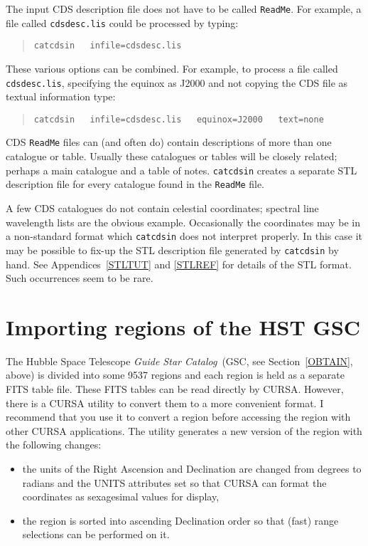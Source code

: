 \documentclass[twoside,11pt]{article}
\newcommand{\xlabel}[1]{}
\renewcommand{\_}{\texttt{\symbol{95}}}
\begin{document}
The input CDS description file does not have to be called {\tt ReadMe}.
For example, a file called {\tt cdsdesc.lis} could be processed by
typing:

\begin{verse}
{\tt catcdsin ~ infile=cdsdesc.lis}
\end{verse}

These various options can be combined.  For example, to process a
file called {\tt cdsdesc.lis}, specifying the equinox as J2000 and
not copying the CDS file as textual information type:

\begin{verse}
{\tt catcdsin ~ infile=cdsdesc.lis ~ equinox=J2000 ~ text=none}
\end{verse}

CDS {\tt ReadMe} files can (and often do) contain descriptions of more
than one catalogue or table.  Usually these catalogues or tables will
be closely related; perhaps a main catalogue and a table of notes.
{\tt catcdsin} creates a separate STL description file for every
catalogue found in the {\tt ReadMe} file.

A few CDS catalogues do not contain celestial coordinates; spectral
line wavelength lists are the obvious example.  Occasionally the
coordinates may be in a non-standard format which {\tt catcdsin} does
not interpret properly.  In this case it may be possible to fix-up the
STL description file generated by {\tt catcdsin} by hand.  See
Appendices~\ref{STLTUT} and \ref{STLREF} for details of the STL format.
Such occurrences seem to be rare.


\section{\xlabel{GSCIN}\label{GSCIN}Importing regions of the HST GSC}

The Hubble Space Telescope {\it Guide Star Catalog}\, (GSC, see
Section~\ref{OBTAIN}, above) is divided into some 9537 regions and
each region is held as a separate FITS table file. These FITS tables can
be read directly by CURSA. However, there is a CURSA utility to convert
them to a more convenient format. I recommend that you use it to
convert a region before accessing the region with other CURSA applications.
The utility generates a new version of the region with the following
changes:

\begin{itemize}

  \item the units of the Right Ascension and Declination are changed
   from degrees to radians and the UNITS attributes set so that CURSA
   can format the coordinates as sexagesimal values for display,

  \item the region is sorted into ascending Declination order so that
   (fast) range selections can be performed on it.

\end{itemize}
\end{document}
